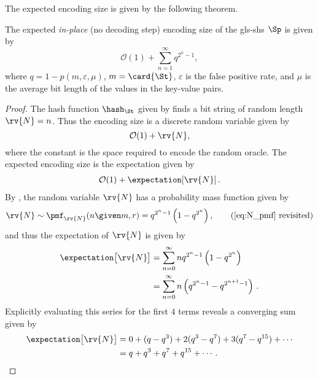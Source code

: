 \documentclass{article}
\begin{document}
The expected encoding size is given by the following theorem.
\begin{theorem}
\label{thm:open_expect}
The expected \emph{in-place} (no decoding step) encoding size of the \gls{gls-shs} $\Sp$ is given by
\begin{equation}
    \mathcal{O}(1) + \sum_{n=1}^{\infty} q^{2^n-1},
\end{equation}
where $q=1 - p(m,\varepsilon,\mu)$, $m = \card{\St}$, $\varepsilon$ is the false positive rate, and $\mu$ is the average bit length of the values in the key-value pairs.
\end{theorem}
\begin{proof}
The hash function $\hash_{\St}$ given by  finds a bit string of random length $\rv{N} = n$. Thus the encoding size is a discrete random variable given by
\begin{equation}
    \mathcal{O}(1) + \rv{N},
\end{equation}
where the constant is the space required to encode the random oracle. The expected encoding size is the expectation given by
\begin{align}
    \mathcal{O}(1) + \expectation[\rv{N}]\,.
\end{align}
By , the random variable $\rv{N}$ has a probability mass function given by
\begin{equation*}
    \rv{N} \sim \pmf_{\rv{N}}(n \given m,r) = q^{2^n-1}\left(1 - q^{2^n}\right),
    \tag{\ref{eq:N_pmf} revisited}
\end{equation*}
and thus the expectation of $\rv{N}$ is given by
\begin{align}
    \expectation\!\left[\rv{N}\right]
    &= \sum_{n=0}^{\infty} n q^{2^n-1}\left(1 - q^{2^n}\right)\\
    &= \sum_{n=0}^{\infty} n \left(q^{2^n-1} - q^{2^{n+1}-1}\right)\,.
\end{align}
Explicitly evaluating this series for the first $4$ terms reveals a converging sum given by
\begin{align}
    \expectation\!\left[\rv{N}\right]
        &= 0 + (q - q^3) + 2(q^3 - q^7) + 3(q^7 - q^{15}) + \cdots\\
        &= q + q^3 + q^7 + q^{15} + \cdots\,.
\end{align}
\end{proof}


\printglossary

\end{document}
